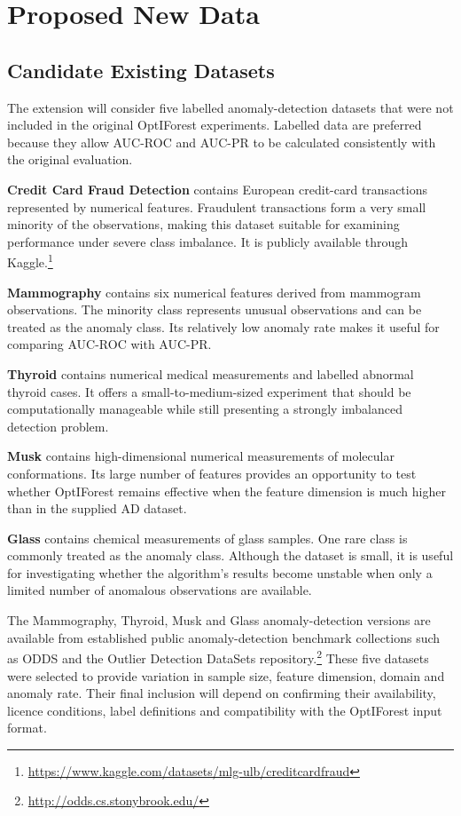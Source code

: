 \documentclass[11pt]{article}
\begin{document}
\section{Proposed New Data}

\subsection{Candidate Existing Datasets}
The extension will consider five labelled anomaly-detection datasets that
were not included in the original OptIForest experiments. Labelled data
are preferred because they allow AUC-ROC and AUC-PR to be calculated
consistently with the original evaluation.

\textbf{Credit Card Fraud Detection} contains European credit-card
transactions represented by numerical features. Fraudulent transactions
form a very small minority of the observations, making this dataset
suitable for examining performance under severe class imbalance. It is
publicly available through Kaggle.\footnote{\url{https://www.kaggle.com/datasets/mlg-ulb/creditcardfraud}}

\textbf{Mammography} contains six numerical features derived from
mammogram observations. The minority class represents unusual
observations and can be treated as the anomaly class. Its relatively low
anomaly rate makes it useful for comparing AUC-ROC with AUC-PR.

\textbf{Thyroid} contains numerical medical measurements and labelled
abnormal thyroid cases. It offers a small-to-medium-sized experiment that
should be computationally manageable while still presenting a strongly
imbalanced detection problem.

\textbf{Musk} contains high-dimensional numerical measurements of
molecular conformations. Its large number of features provides an
opportunity to test whether OptIForest remains effective when the feature
dimension is much higher than in the supplied AD dataset.

\textbf{Glass} contains chemical measurements of glass samples. One rare
class is commonly treated as the anomaly class. Although the dataset is
small, it is useful for investigating whether the algorithm's results
become unstable when only a limited number of anomalous observations are
available.

The Mammography, Thyroid, Musk and Glass anomaly-detection versions are
available from established public anomaly-detection benchmark
collections such as ODDS and the Outlier Detection DataSets
repository.\footnote{\url{http://odds.cs.stonybrook.edu/}}
These five datasets were selected to provide variation in sample size,
feature dimension, domain and anomaly rate. Their final inclusion will
depend on confirming their availability, licence conditions, label
definitions and compatibility with the OptIForest input format.
\end{document}
